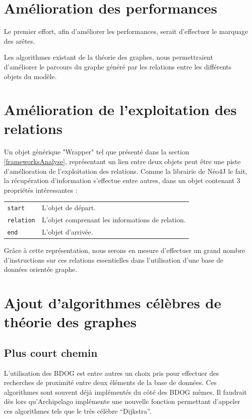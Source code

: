 \documentclass[a4paper,fleqn,12pt,oneside]{report}
\begin{document}
\section{Amélioration des performances}

Le premier effort, afin d'améliorer les performances, serait d'effectuer le marquage des arêtes.

Les algorithmes existant de la théorie des graphes, nous permettraient d'améliorer le parcours du graphe généré par les relations entre les différents objets du modèle. \cite{solnontheorie}

\section{Amélioration de l'exploitation des relations}

Un objet générique "Wrapper" tel que présenté dans la section \ref{frameworksAnalyse}, représentant un lien entre deux objets peut être une piste d'amélioration de l'exploitation des relations. Comme la librairie de Néo4J le fait, la récupération d'information s'effectue entre autres, dans un objet contenant 3 propriétés intéressantes :

\begin{tabular}[c]{l M{12cm}}
\texttt{start} & L'objet de départ.  \tabularnewline
\texttt{relation} & L'objet comprenant les informations de relation.  \tabularnewline
\texttt{end} & L'objet d'arrivée.  \tabularnewline
\end{tabular}

Grâce à cette représentation, nous serons en mesure d'effectuer un grand nombre d'instructions sur ces relations essentielles dans l'utilisation d'une base de données orientée graphe.

\section{Ajout d'algorithmes célèbres de théorie des graphes}

\subsection*{Plus court chemin}

L'utilisation des BDOG est entre autres un choix pris pour effectuer des recherches de proximité entre deux éléments de la base de données. Ces algorithmes sont souvent déjà implémentés du côté des BDOG mêmes. Il faudrait dès lors qu'Archipelago implémente une nouvelle fonction permettant d'appeler ces algorithmes tels que le très célèbre \enquote{Dijkstra}\cite{dijkstra1959note}. 
\end{document}
